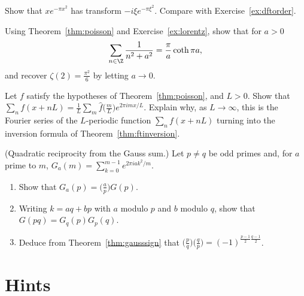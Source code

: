 \begin{exercise}[$\star$]\label{ex:hermite}
Show that $xe^{-\pi x^2}$ has transform $-i\xi e^{-\pi\xi^2}$. Compare with Exercise~\ref{ex:dftorder}.
\end{exercise}

\begin{exercise}[$\star\star$]\label{ex:coth}
Using Theorem~\ref{thm:poisson} and Exercise~\ref{ex:lorentz}, show that for $a>0$
\[
\sum_{n\in\Z}\frac1{n^2+a^2}=\frac\pi a\coth\pi a,
\]
and recover $\zeta(2)=\frac{\pi^2}6$ by letting $a\to0$.
\end{exercise}

\begin{exercise}[$\star\star$]\label{ex:periodize}
Let $f$ satisfy the hypotheses of Theorem~\ref{thm:poisson}, and $L>0$. Show that $\sum_nf(x+nL)=\frac1L\sum_m\hat f\bigl(\frac mL\bigr)e^{2\pi imx/L}$. Explain why, as $L\to\infty$,
this is the Fourier series of the $L$-periodic function $\sum_nf(x+nL)$ turning into the inversion formula of Theorem~\ref{thm:ftinversion}.
\end{exercise}

\begin{exercise}[$\star\star\star$]\label{ex:reciprocity}
(Quadratic reciprocity from the Gauss sum.) Let $p\ne q$ be odd primes and, for $a$ prime to $m$, $G_a(m)=\sum_{k=0}^{m-1}e^{2\pi iak^2/m}$.
\begin{enumerate}[label=(\alph*)]
\item Show that $G_a(p)=\bigl(\frac ap\bigr)G(p)$.
\item Writing $k=aq+bp$ with $a$ modulo $p$ and $b$ modulo $q$, show that $G(pq)=G_q(p)G_p(q)$.
\item Deduce from Theorem~\ref{thm:gausssign} that $\bigl(\frac pq\bigr)\bigl(\frac qp\bigr)=(-1)^{\frac{p-1}2\frac{q-1}2}$.
\end{enumerate}
\end{exercise}

\section{Hints}

